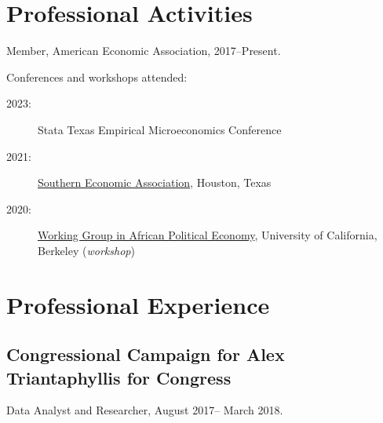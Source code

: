 \documentclass[10pt,letterpaper]{article}
\renewenvironment{itemize}{
  \begin{list}{}{
    \setlength{\leftmargin}{1.5em}
  }
}{
  \end{list}
}
\begin{document}
\section*{Professional Activities}
%
\begin{itemize}
%
\item Member, American Economic Association, 2017--Present.
%
%
%
\item Conferences and workshops attended:
%
\begin{description}

\item[2023:] Stata Texas Empirical Microeconomics Conference %
\item[2021:] \href{https://www.southerneconomic.org/session-details/?conferenceId=7&eventId=3353}%
{Southern Economic Association}, Houston, Texas
  \item[2020:] \href{https://cega.berkeley.edu/initiative/working-group-in-african-political-economy/}%
{Working Group in African Political Economy}, University of  California, Berkeley (\textit{workshop})
\end{description}
%
\end{itemize}
%
\section*{Professional Experience}
\subsection*{Congressional Campaign for Alex Triantaphyllis for Congress}
\begin{itemize}
\item Data Analyst and Researcher, August 2017-- March 2018.
\end{itemize}
\end{document}
